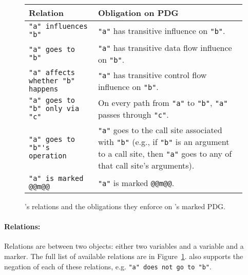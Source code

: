 \begin{figure}
  \small
  \begin{tabular}{|p{5.5cm}|p{8cm}|}
      \hline
      \syslang{} Relation                                                       &  Obligation on PDG                   \\ \hline
      \lstinline[language=CNL]|"a" influences "b"|                              & \lstinline[language=CNL]|"a"| has transitive influence on \lstinline[language=CNL]|"b"|. \\
      \hline
      \lstinline[language=CNL]|"a" goes to "b"|                                 &  \lstinline[language=CNL]|"a"| has transitive data flow influence on \lstinline[language=CNL]|"b"|. \\
      \hline
      \lstinline[language=CNL]|"a" affects whether "b" happens|                 & \lstinline[language=CNL]|"a"| has transitive control flow influence on \lstinline[language=CNL]|"b"|. \\
      
      \hline
      \lstinline[language=CNL]|"a" goes to "b" only via "c"|                    & On every path from \lstinline[language=CNL]|"a"| to \lstinline[language=CNL]|"b"|,
                                                                                  \lstinline[language=CNL]|"a"| passes through \lstinline[language=CNL]|"c"|. \\
      \hline
      \lstinline[language=CNL]|"a" goes to "b"'s operation|                     & \lstinline[language=CNL]|"a"| goes to the call site associated with \lstinline[language=CNL]|"b"|
                                                                                 (e.g., if \lstinline[language=CNL]|"b"| is an argument to a call site, then \lstinline[language=CNL]|"a"| goes to any of that call site's arguments). \\
      \hline 
      \lstinline[language=CNL]|"a" is marked @@m@@|                             & \lstinline[language=CNL]|"a"| is marked \lstinline[language=CNL]|@@m@@|. \\
             
    \hline
  \end{tabular}
    \caption{\syslang's relations and the obligations they enforce on \sys's marked PDG.}
    \label{f:relations}
\end{figure}

\paragraph{Relations: }
%
Relations are between two objects: either two variables and a variable and a marker.
%
The full list of available relations are in Figure~\ref{f:relations}.
%
\syslang{} also supports the negation of each of these relations, e.g. \lstinline[language=CNL]|"a" does not go to "b"|.

